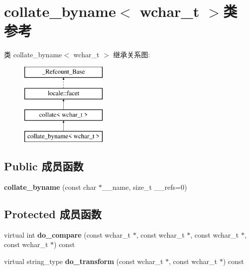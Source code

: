 \hypertarget{classcollate__byname_3_01wchar__t_01_4}{}\section{collate\+\_\+byname$<$ wchar\+\_\+t $>$类 参考}
\label{classcollate__byname_3_01wchar__t_01_4}
类 collate\+\_\+byname$<$ wchar\+\_\+t $>$ 继承关系图\+:\begin{figure}[H]
\begin{center}
\leavevmode
\includegraphics[height=4.000000cm]{classcollate__byname_3_01wchar__t_01_4}
\end{center}
\end{figure}
\subsection*{Public 成员函数}
\begin{DoxyCompactItemize}
\item 
\mbox{\label{classcollate__byname_3_01wchar__t_01_4_aa8d89216f9955734aa5428ce703cb37c}} 
{\bfseries collate\+\_\+byname} (const char $\ast$\+\_\+\+\_\+name, size\+\_\+t \+\_\+\+\_\+refs=0)
\end{DoxyCompactItemize}
\subsection*{Protected 成员函数}
\begin{DoxyCompactItemize}
\item 
\mbox{\label{classcollate__byname_3_01wchar__t_01_4_a44bfabd85c93930f26c16d3918a23bb3}} 
virtual int {\bfseries do\+\_\+compare} (const wchar\+\_\+t $\ast$, const wchar\+\_\+t $\ast$, const wchar\+\_\+t $\ast$, const wchar\+\_\+t $\ast$) const
\item 
\mbox{\label{classcollate__byname_3_01wchar__t_01_4_a222141392e74a22174f53f96914ce482}} 
virtual string\+\_\+type {\bfseries do\+\_\+transform} (const wchar\+\_\+t $\ast$, const wchar\+\_\+t $\ast$) const
\end{DoxyCompactItemize}
